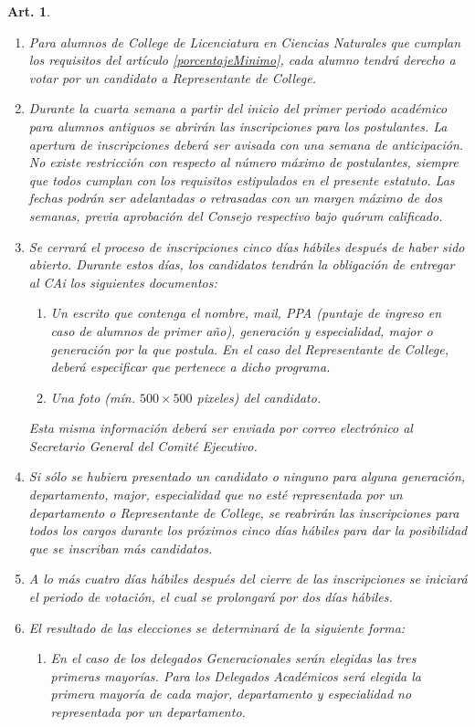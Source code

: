 \documentclass[letterpaper,11pt]{article}
\theoremstyle{plain}
\newtheorem{art}{Art.} %
\begin{document}
\begin{art}
\begin{enumerate}
				\item Para alumnos de College de Licenciatura en Ciencias Naturales que cumplan los requisitos del artículo \ref{porcentajeMinimo}, cada alumno tendrá derecho a votar por un candidato a Representante de College.
				\item Durante la cuarta semana a partir del inicio del primer periodo académico para alumnos antiguos se abrirán las inscripciones para los postulantes. La apertura de inscripciones deberá ser avisada con una semana de anticipación. No existe restricción con respecto al número máximo de postulantes, siempre que todos cumplan con los requisitos estipulados en el presente estatuto. Las fechas podrán ser adelantadas o retrasadas con un margen máximo de dos semanas, previa aprobación del Consejo respectivo bajo quórum calificado.
				\item Se cerrará el proceso de inscripciones cinco días hábiles después de haber sido abierto. Durante estos días, los candidatos tendrán la obligación de entregar al CAi los siguientes documentos:
					\begin{enumerate}
						\item Un escrito que contenga el nombre, mail, PPA (puntaje de ingreso en caso de alumnos de primer año), generación y especialidad, major o generación por la que postula.  En el caso del Representante de College, deberá especificar que pertenece a dicho programa.
						\item Una foto (mín. $500 \times 500$ pixeles) del candidato.
					\end{enumerate}
				Esta misma información deberá ser enviada por correo electrónico al Secretario General del Comité Ejecutivo.
				\item Si sólo se hubiera presentado un candidato o ninguno para alguna generación, departamento, major, especialidad que no esté representada por un departamento o Representante de College, se reabrirán las inscripciones para todos los cargos durante los próximos cinco días hábiles para dar la posibilidad que se inscriban más candidatos.
				\item A lo más cuatro días hábiles después del cierre de las inscripciones se iniciará el periodo de votación, el cual se prolongará por dos días hábiles.
				\item El resultado de las elecciones se determinará de la siguiente forma:
					\begin{enumerate}
						\item En el caso de los delegados Generacionales serán elegidas las tres primeras mayorías. Para los Delegados Académicos será elegida la primera mayoría de cada major, departamento y especialidad no representada por un departamento.

\end{enumerate}
\end{enumerate}
\end{art}
\end{document}
